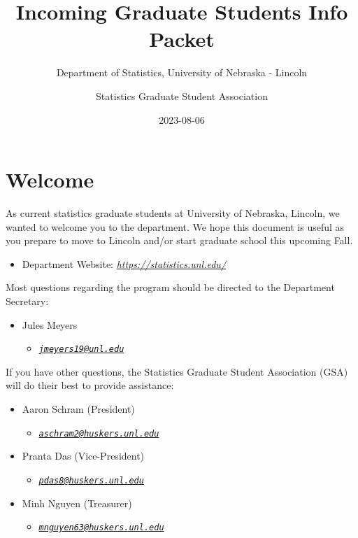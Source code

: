 \documentclass[
  12pt,
]{book}
\title{Incoming Graduate Students Info Packet}
\subtitle{Department of Statistics, University of Nebraska - Lincoln}
\author{Statistics Graduate Student Association}
\date{2023-08-06}
\providecommand{\tightlist}{%
  \setlength{\itemsep}{0pt}\setlength{\parskip}{0pt}}
\begin{document}
\maketitle

{
\setcounter{tocdepth}{1}
\tableofcontents
}
\hypertarget{welcome}{%
\chapter{Welcome}\label{welcome}}

As current statistics graduate students at University of Nebraska, Lincoln, we wanted to welcome you to the department. We hope this document is useful as you prepare to move to Lincoln and/or start graduate school this upcoming Fall.

\begin{itemize}
\tightlist
\item
  Department Website: \emph{\url{https://statistics.unl.edu/}}
\end{itemize}

Most questions regarding the program should be directed to the Department Secretary:

\begin{itemize}
\tightlist
\item
  Jules Meyers

  \begin{itemize}
  \tightlist
  \item
    \emph{\href{mailto:jmeyers19@unl.edu}{\nolinkurl{jmeyers19@unl.edu}}}
  \end{itemize}
\end{itemize}

If you have other questions, the Statistics Graduate Student Association (GSA) will do their best to provide assistance:

\begin{itemize}
\tightlist
\item
  Aaron Schram (President)

  \begin{itemize}
  \tightlist
  \item
    \emph{\href{mailto:aschram2@huskers.unl.edu}{\nolinkurl{aschram2@huskers.unl.edu}}}
  \end{itemize}
\item
  Pranta Das (Vice-President)

  \begin{itemize}
  \tightlist
  \item
    \emph{\href{mailto:pdas8@huskers.unl.edu}{\nolinkurl{pdas8@huskers.unl.edu}}}
  \end{itemize}
\item
  Minh Nguyen (Treasurer)

  \begin{itemize}
  \tightlist
  \item
    \emph{\href{mailto:mnguyen63@huskers.unl.edu}{\nolinkurl{mnguyen63@huskers.unl.edu}}}
  \end{itemize}
\end{itemize}
\end{document}

